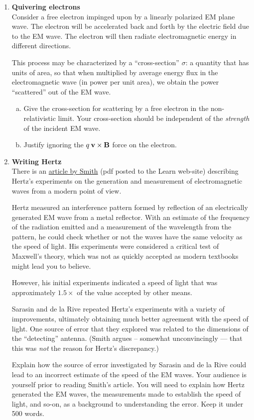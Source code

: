 \documentclass[12pt,geometry,width=8in]{article}
\begin{document}
\begin{enumerate}[(1),topsep=0pt,itemsep=0ex,partopsep=1ex,parsep=1ex]
\newpage

\item \textbf{Quivering electrons}\\
Consider a free electron impinged upon by a linearly polarized EM plane wave.  The electron will be accelerated back and forth by the electric field due to the EM wave.  The electron will then radiate electromagnetic energy in different directions.

This process may be characterized by a ``cross-section'' $\sigma$: a quantity that has units of area, so that when multiplied by average energy flux in the electromagnetic wave (in power per unit area), we obtain the power ``scattered'' out of the EM wave.

\begin{enumerate}[(a)]
\item Give the cross-section for scattering by a free electron in the non-relativistic limit.  Your cross-section should be independent of the {\em strength} of the incident EM wave.
\item Justify ignoring the $q \: \boldsymbol{\mathbf{v}} \times \boldsymbol{\mathbf{B}}$ force on the electron.
\end{enumerate}

\item \textbf{Writing Hertz}\\
There is an \href{https://dx.doi.org/ghm5zs}{article by Smith} (pdf posted to the Learn web-site) describing Hertz's experiments on the generation and measurement of electromagnetic waves from a modern point of view.

Hertz measured an interference pattern formed by reflection of an electrically generated EM wave from a metal reflector.  With an estimate of the frequency of the radiation emitted and a measurement of the wavelength from the pattern, he could check whether or not the waves have the same velocity as the speed of light.  His experiments were considered a critical test of Maxwell's theory, which was not as quickly accepted as modern textbooks might lead you to believe.

However, his initial experiments indicated a speed of light that was approximately $1.5 \times$ of the value accepted by other means.

Sarasin and de la Rive repeated Hertz's experiments with a variety of improvements, ultimately obtaining much better agreement with the speed of light.  One source of error that they explored was related to the dimensions of the ``detecting'' antenna.  (Smith argues -- somewhat unconvincingly --- that this was {\em not} the reason for Hertz's discrepancy.)

Explain how the source of error investigated by Sarasin and de la Rive could lead to an incorrect estimate of the speed of the EM waves.  Your audience is yourself prior to reading Smith's article.  You will need to explain how Hertz generated the EM waves, the measurements made to establish the speed of light, and so-on, as a background to understanding the error.  Keep it under 500 words.

\end{enumerate}
\end{document}
